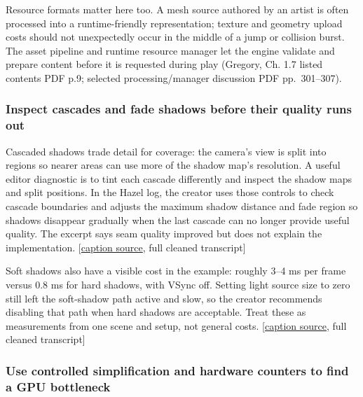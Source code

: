 Resource formats matter here too. A mesh source authored by an artist is often processed into a runtime-friendly representation; texture and geometry upload costs should not unexpectedly occur in the middle of a jump or collision burst. The asset pipeline and runtime resource manager let the engine validate and prepare content before it is requested during play (Gregory, Ch. 1.7 listed contents PDF p.9; selected processing/manager discussion PDF pp.~301--307).

\subsubsection{Inspect cascades and fade shadows before their quality runs out}\label{06-engine-ii-ch026-inspect-cascades-and-fade-shadows-before-their-quality-runs-out}

\hypertarget{06-engine-ii-ch026-inspect-cascades-and-fade-shadows-before-their-quality-runs-out}{}

Cascaded shadows trade detail for coverage: the camera's view is split into regions so nearer areas can use more of the shadow map's resolution. A useful editor diagnostic is to tint each cascade differently and inspect the shadow maps and split positions. In the Hazel log, the creator uses those controls to check cascade boundaries and adjusts the maximum shadow distance and fade region so shadows disappear gradually when the last cascade can no longer provide useful quality. The excerpt says seam quality improved but does not explain the implementation. {[}\href{https://www.youtube.com/watch?v=qbDrqARX07o}{caption source}, full cleaned transcript{]}

Soft shadows also have a visible cost in the example: roughly 3--4 ms per frame versus 0.8 ms for hard shadows, with VSync off. Setting light source size to zero still left the soft-shadow path active and slow, so the creator recommends disabling that path when hard shadows are acceptable. Treat these as measurements from one scene and setup, not general costs. {[}\href{https://www.youtube.com/watch?v=qbDrqARX07o}{caption source}, full cleaned transcript{]}

\subsubsection{Use controlled simplification and hardware counters to find a GPU bottleneck}\label{06-engine-ii-ch026-use-controlled-simplification-and-hardware-counters-to-find-a-gpu-bottleneck}

